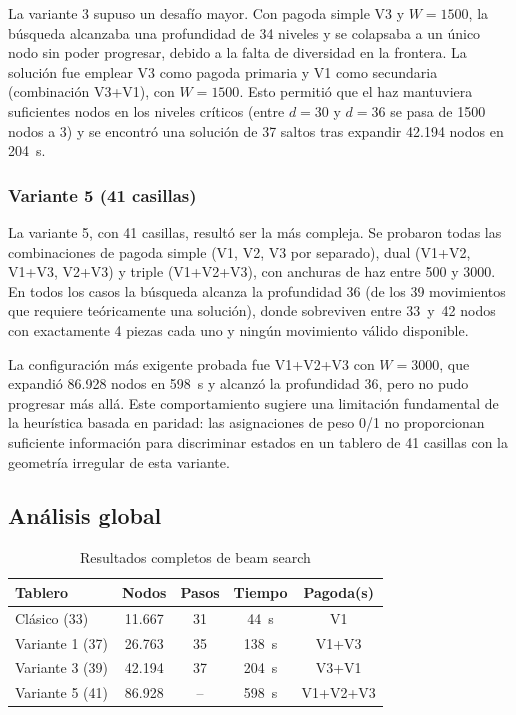 \documentclass[conference,a4paper]{IEEEtran}
\begin{document}
La variante 3 supuso un desafío mayor. Con pagoda simple V3 y $W=1500$,
la búsqueda alcanzaba una profundidad de 34 niveles y se colapsaba a un único
nodo sin poder progresar, debido a la falta de diversidad en la frontera. La
solución fue emplear V3 como pagoda primaria y V1 como secundaria
(combinación V3+V1), con $W=1500$. Esto permitió que el haz mantuviera
suficientes nodos en los niveles críticos (entre $d=30$ y $d=36$ se pasa de
1500 nodos a 3) y se encontró una solución de 37 saltos tras expandir 42.194
nodos en 204~s.

\subsubsection{Variante 5 (41 casillas)}

La variante 5, con 41 casillas, resultó ser la más compleja. Se probaron
todas las combinaciones de pagoda simple (V1, V2, V3 por separado), dual
(V1+V2, V1+V3, V2+V3) y triple (V1+V2+V3), con anchuras de haz entre 500 y
3000. En todos los casos la búsqueda alcanza la profundidad 36 (de los 39
movimientos que requiere teóricamente una solución), donde sobreviven entre
33~y~42 nodos con exactamente 4 piezas cada uno y ningún movimiento válido
disponible.

La configuración más exigente probada fue V1+V2+V3 con $W=3000$, que expandió
86.928 nodos en 598~s y alcanzó la profundidad 36, pero no pudo progresar más
allá. Este comportamiento sugiere una limitación fundamental de la heurística
basada en paridad: las asignaciones de peso 0/1 no proporcionan suficiente
información para discriminar estados en un tablero de 41 casillas con la
geometría irregular de esta variante.

\subsection{Análisis global}

\begin{table}
  \caption{Resultados completos de beam search}
  \label{tab:resumen}
  \centering
  \begin{tabular}{lcccc}
    \toprule
    Tablero & Nodos & Pasos & Tiempo & Pagoda(s) \\
    \midrule
    Clásico (33)    & 11.667  & 31 & 44~s   & V1 \\
    Variante 1 (37) & 26.763  & 35 & 138~s  & V1+V3 \\
    Variante 3 (39) & 42.194  & 37 & 204~s  & V3+V1 \\
    Variante 5 (41) & 86.928  & -- & 598~s & V1+V2+V3 \\
    \bottomrule
  \end{tabular}
\end{table}
\end{document}
